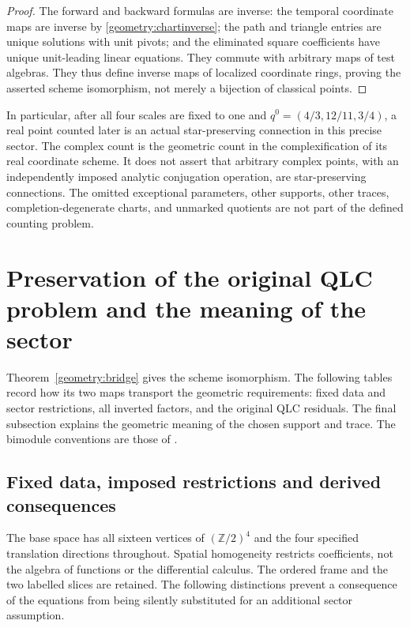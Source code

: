 \documentclass[11pt,a4paper]{article}
\theoremstyle{remark}\newtheorem{remark}[theorem]{Remark}
\begin{document}
\begin{proof}
The forward and backward formulas are inverse: the temporal coordinate
maps are inverse by \eqref{geometry:chartinverse}; the path and triangle
entries are unique solutions with unit pivots; and the eliminated square
coefficients have unique unit-leading linear equations. They commute with
arbitrary maps of test algebras. They thus define inverse maps of localized
coordinate rings, proving the asserted scheme isomorphism, not merely a
bijection of classical points.
\end{proof}

In particular, after all four scales are fixed to one and
\(q^0=(4/3,12/11,3/4)\), a real point counted later is an actual
star-preserving connection in this precise sector. The complex count is
the geometric count in the complexification of its real coordinate scheme.
It does not assert that arbitrary complex points, with an independently
imposed analytic conjugation operation, are star-preserving connections.
The omitted exceptional parameters, other supports, other traces,
completion-degenerate charts, and unmarked quotients are not part of the
defined counting problem.

\section{Preservation of the original QLC problem and the meaning of the sector}
\label{integrity:section}

Theorem~\ref{geometry:bridge} gives the scheme isomorphism. The following
tables record how its two maps transport the geometric requirements:
fixed data and sector restrictions, all inverted factors, and the original
QLC residuals. The final subsection explains the geometric meaning of the
chosen support and trace. The bimodule conventions are those of
\cite{beggs-majid-star,majid-graphs}.

\subsection{Fixed data, imposed restrictions and derived consequences}
\label{integrity:choices}

The base space has all sixteen vertices of $(\mathbb Z/2)^4$ and the
four specified translation directions throughout. Spatial homogeneity
restricts coefficients, not the algebra of functions or the differential
calculus. The ordered frame and the two labelled slices are retained.
The following distinctions prevent a consequence of the equations from
being silently substituted for an additional sector assumption.
\end{document}
